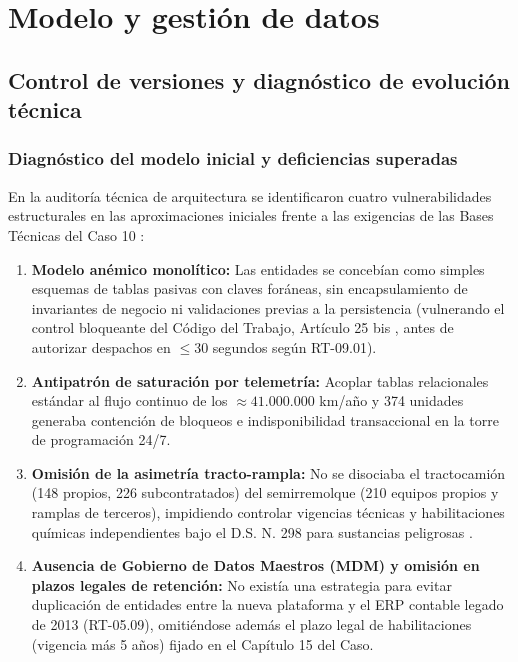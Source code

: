 \section{Modelo y gestión de datos}

\subsection{Control de versiones y diagnóstico de evolución técnica}

\subsubsection{Diagnóstico del modelo inicial y deficiencias superadas}

En la auditoría técnica de arquitectura se identificaron cuatro vulnerabilidades estructurales en las aproximaciones iniciales frente a las exigencias de las Bases Técnicas del Caso 10 \parencite{bases_caso10_2026}:

\begin{enumerate}
    \item \textbf{Modelo anémico monolítico:} Las entidades se concebían como simples esquemas de tablas pasivas con claves foráneas, sin encapsulamiento de invariantes de negocio ni validaciones previas a la persistencia (vulnerando el control bloqueante del Código del Trabajo, Artículo 25 bis \parencite{codigo_trabajo_25bis}, antes de autorizar despachos en $\le 30$ segundos según RT-09.01).
    \item \textbf{Antipatrón de saturación por telemetría:} Acoplar tablas relacionales estándar al flujo continuo de los $\approx 41.000.000$ km/año y 374 unidades generaba contención de bloqueos e indisponibilidad transaccional en la torre de programación 24/7.
    \item \textbf{Omisión de la asimetría tracto-rampla:} No se disociaba el tractocamión (148 propios, 226 subcontratados) del semirremolque (210 equipos propios y ramplas de terceros), impidiendo controlar vigencias técnicas y habilitaciones químicas independientes bajo el D.S. N.\textordmasculine{} 298 para sustancias peligrosas \parencite{ds298}.
    \item \textbf{Ausencia de Gobierno de Datos Maestros (MDM) y omisión en plazos legales de retención:} No existía una estrategia para evitar duplicación de entidades entre la nueva plataforma y el ERP contable legado de 2013 (RT-05.09), omitiéndose además el plazo legal de habilitaciones (vigencia más 5 años) fijado en el Capítulo 15 del Caso.
\end{enumerate}

